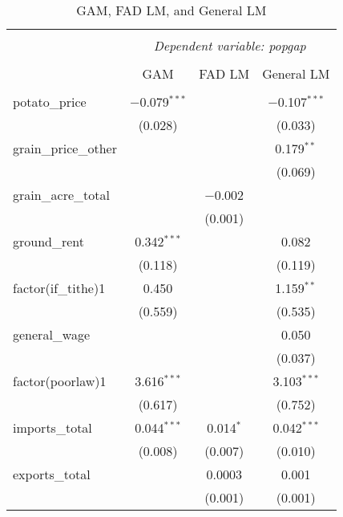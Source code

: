 \begin{table}[h]
    \centering
    \caption{GAM, FAD LM, and General LM}
    \begin{tabular}{@{\extracolsep{5pt}}lccc}
    \\[-1.8ex]\hline
    \hline \\[-1.8ex]
    & \multicolumn{3}{c}{\textit{Dependent variable: popgap}} \\
    \cline{2-4}
    \\[-1.8ex] & GAM & FAD LM & General LM \\
    \hline \\[-1.8ex]
    potato\_price & $-$0.079$^{***}$ & & $-$0.107$^{***}$ \\
     & (0.028) & & (0.033) \\
    grain\_price\_other & &  & 0.179$^{**}$ \\
     & &  & (0.069) \\
    grain\_acre\_total & & $-$0.002 & \\
     & & (0.001) & \\
    ground\_rent & 0.342$^{***}$ & & 0.082 \\
     & (0.118) & & (0.119) \\
    factor(if\_tithe)1 & 0.450 & & 1.159$^{**}$ \\
     & (0.559) & & (0.535) \\
    general\_wage & & & 0.050 \\
     & & & (0.037) \\
    factor(poorlaw)1 & 3.616$^{***}$ & & 3.103$^{***}$ \\
     & (0.617) & & (0.752) \\
    imports\_total & 0.044$^{***}$ & 0.014$^{*}$ & 0.042$^{***}$ \\
     & (0.008) & (0.007) & (0.010) \\
    exports\_total & & 0.0003 & 0.001 \\
     & & (0.001) & (0.001) \\


\end{tabular}
\end{table}
